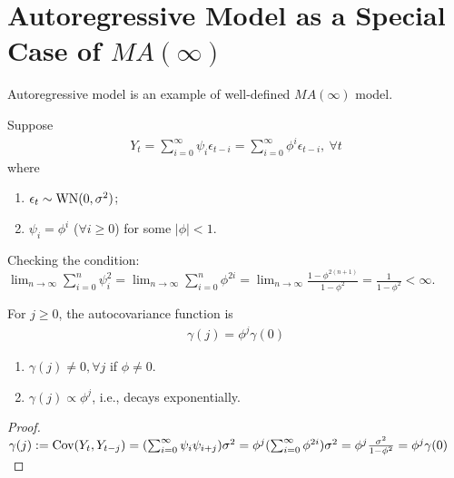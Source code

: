 \documentclass[11pt]{elegantbook}
\begin{document}
\section{Autoregressive Model as a Special Case of $MA(\infty)$}
Autoregressive model is an example of well-defined $MA(\infty)$ model.
\begin{example}
    Suppose
    \begin{equation}
        \begin{aligned}
            Y_{t}=\sum_{i=0}^\infty \psi_i\epsilon_{t-i}=\sum_{i=0}^\infty \phi^i\epsilon_{t-i},\ \forall t
        \end{aligned}
        \nonumber
    \end{equation}
    where
    \begin{enumerate}[$\circ$]
        \item $\epsilon_t\sim \textnormal{WN}(0,\sigma^2)$;
        \item $\psi_i=\phi^i$ ($\forall i\geq 0$) for some $|\phi|<1$.
    \end{enumerate}
\end{example}
Checking the condition: $\lim_{n \rightarrow \infty}\sum_{i=0}^n\psi_i^2=\lim_{n \rightarrow \infty}\sum_{i=0}^n\phi^{2i}=\lim_{n \rightarrow \infty}\frac{1-\phi^{2(n+1)}}{1-\phi^2}=\frac{1}{1-\phi^2}<\infty$.

\begin{lemma}
    For $j\geq 0$, the autocovariance function is
    \begin{equation}
        \begin{aligned}
            \gamma(j)=\phi^j \gamma(0)
        \end{aligned}
        \nonumber
    \end{equation}
    \begin{note}
        \begin{enumerate}
            \item $\gamma(j)\neq 0, \forall j$ if $\phi\neq 0$.
            \item $\gamma(j)\propto \phi^j$, i.e., decays exponentially.
        \end{enumerate}
    \end{note}
\end{lemma}
\begin{proof}
    $\gamma(j):=\textnormal{Cov}(Y_t,Y_{t-j})=(\sum_{i=0}^{\infty}\psi_i\psi_{i+j})\sigma^2=\phi^{j}(\sum_{i=0}^{\infty}\phi^{2i})\sigma^2=\phi^j\frac{\sigma^2}{1-\phi^2}=\phi^j \gamma(0)$
\end{proof}
\end{document}
